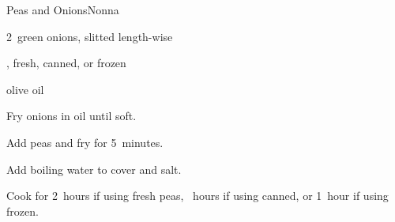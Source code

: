 \begin{recipe}{Peas and Onions}{Nonna}{}

\begin{ingredients}
\item 2~green onions, slitted length-wise
\item {}, fresh, canned, or frozen
\item olive oil
\end{ingredients}

\begin{directions}
\item Fry onions in oil until soft.
\item Add peas and fry for 5~minutes.
\item Add boiling water to cover and salt.
\item Cook for 2~hours if using fresh peas, \threequarter~hours if using canned, or 1~hour if using frozen.
\end{directions}

\end{recipe}
